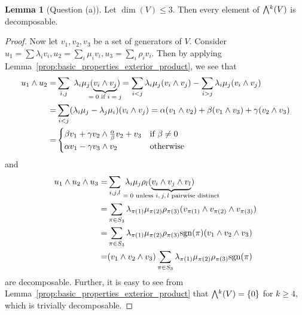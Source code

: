 \documentclass{scrartcl}
\newcommand{\sgn}{\mathrm{sgn}}
\newcommand{\extpow}{\mathchoice{{\textstyle\bigwedge}}
    {{\bigwedge}}
    {{\textstyle\wedge}}
    {{\scriptstyle\wedge}}}
\theoremstyle{definition}
\newtheorem{lemma}[subsection]{Lemma}
\begin{document}
\begin{lemma}[Question (a)]
    Let $\dim(V) \leq 3$. Then every element of $\extpow^k(V)$ is decomposable.
\end{lemma}
\begin{proof}
    Now let $v_1, v_2, v_3$ be a set of generators of $V$.
    Consider $u_1 = \sum \lambda_i v_i, u_2 = \sum_i \mu_i v_i, u_3 = \sum_i \rho_i v_i$.
    Then by applying Lemma~\ref{prop:basic_properties_exterior_product}, we see that 
    \begin{align*}
        u_1 \wedge u_2 =& \sum_{i, j} \ \lambda_i \mu_j (\underbrace{v_i \wedge v_j}_{\mathclap{\text{$= 0$ if $i = j$}}}) = \sum_{i < j} \lambda_i \mu_j (v_i \wedge v_j) - \sum_{i > j} \lambda_i \mu_j (v_i \wedge v_j) \\
        =& \sum_{i < j} (\lambda_i \mu_j - \lambda_j \mu_i)(v_i \wedge v_j) = \alpha (v_1 \wedge v_2) + \beta (v_1 \wedge v_3) + \gamma (v_2 \wedge v_3) \\
        =& \begin{cases}
            \beta v_1 + \gamma v_2 \wedge \frac \alpha \beta v_2 + v_3 & \text{if $\beta \neq 0$} \\
            \alpha v_1 - \gamma v_3 \wedge v_2 & \text{otherwise}
        \end{cases}
    \end{align*}
    and
    \begin{align*}
        u_1 \wedge u_2 \wedge u_3 =& \sum_{i, j, l} \ \lambda_i \mu_j \rho_l (\underbrace{v_i \wedge v_j \wedge v_l}_{\mathclap{\text{$= 0$ unless $i, j, l$ pairwise distinct}}}) \\
        =& \sum_{\pi \in S_3} \lambda_{\pi(1)} \mu_{\pi(2)} \rho_{\pi(3)} (v_{\pi(1)} \wedge v_{\pi(2)} \wedge v_{\pi(3)}) \\
        =& \sum_{\pi \in S_3} \lambda_{\pi(1)} \mu_{\pi(2)} \rho_{\pi(3)} \sgn(\pi) (v_1 \wedge v_2 \wedge v_3) \\
        =& (v_1 \wedge v_2 \wedge v_3) \sum_{\pi \in S_3} \lambda_{\pi(1)} \mu_{\pi(2)} \rho_{\pi(3)} \sgn(\pi)
    \end{align*}
    are decomposable.
    Further, it is easy to see from Lemma~\ref{prop:basic_properties_exterior_product} that $\extpow^k(V) = \{ 0 \}$ for $k \geq 4$, which is trivially decomposable.
\end{proof}
\end{document}
